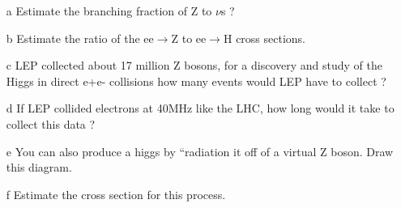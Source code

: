 {\begin{itemize}
\item[a]{Estimate the branching fraction of Z to $\nu$s ?}
\item[b]{Estimate the ratio of the  ee$\rightarrow$Z to ee$\rightarrow$H cross sections.}
\item[c]{LEP collected about 17 million Z bosons, for a discovery and study of the Higgs in direct e+e- collisions how many events would LEP have to collect ?}
\item[d]{If LEP collided electrons at 40MHz like the LHC, how long would it take to collect this data ?}
\item[e]{You can also produce a higgs by ``radiation it off of a virtual Z boson. Draw this diagram.}
\item[f]{Estimate the cross section for this process.}
\end{itemize}

}

